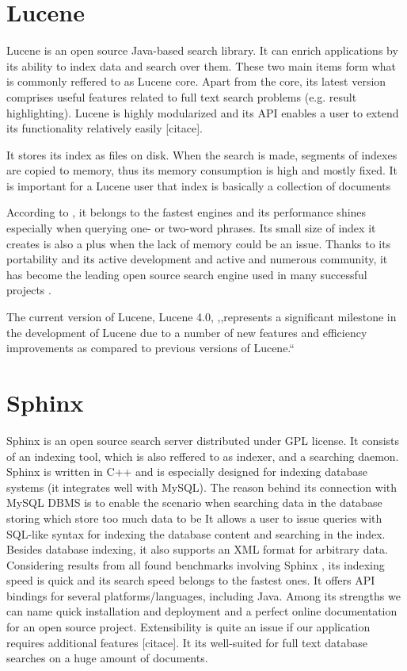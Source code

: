 \section{Lucene}

Lucene \cite{LuceneHome} is an open source Java-based search
library. It can enrich applications by its ability to index data and
search over them. These two main items form what is commonly reffered
to as Lucene core. Apart from the core, its latest version comprises
useful features related to full text search problems (e.g. result
highlighting). Lucene is highly modularized and its API enables a
user to extend its functionality relatively easily {[}citace{]}. 

It stores its index as files on disk. When the search is made, segments
of indexes are copied to memory, thus its memory consumption is high
and mostly fixed. It is important for a Lucene user that index is
basically a collection of documents 

According to \cite{MiddletonBaeza,ComparisonLuceneIndri}, it
belongs to the fastest engines and its performance shines especially
when querying one- or two-word phrases. Its small size of index it
creates is also a plus when the lack of memory could be an issue.
Thanks to its portability and its active development and active and
numerous community, it has become the leading open source search engine
used in many successful projects \cite{LuceneWhoUses}.

The current version of Lucene, Lucene 4.0, ,,represents a significant
milestone in the development of Lucene due to a number of new features
and efficiency improvements as compared to previous versions of Lucene.``
\cite{ApacheLucene4}


\section{Sphinx}

Sphinx \cite{SphinxHome} is an open source search server distributed
under GPL license. 
It consists of an indexing tool, which is also reffered to as indexer, and a searching daemon. 
Sphinx is written in C++ and is especially designed for indexing database systems (it integrates well with MySQL).
The reason behind its connection with MySQL DBMS is to enable the scenario when searching data in the database  storing which store too much data to be 
It allows a user to issue queries with SQL-like syntax for indexing the database content and searching in the index.
Besides database indexing, it also supports an XML format for arbitrary data. 
Considering results from all found benchmarks involving Sphinx \cite{IndriHome,MiddletonBaeza,BenchmarkLuceneSphinxNewer,BenchmarkMysqlLuceneSphinx}, its indexing speed is quick and its search speed belongs to the fastest ones. 
It offers API bindings for several platforms/languages, including
Java. 
Among its strengths we can name quick installation and deployment
and a perfect online documentation for an open source project. 
Extensibility is quite an issue if our application requires additional features
{[}citace{]}. 
It its well-suited for full text database searches on
a huge amount of documents.


